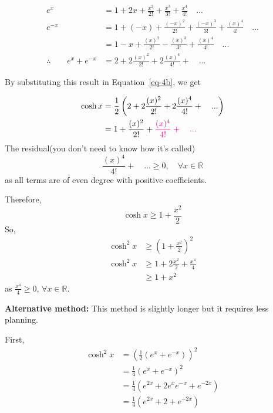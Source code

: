 \documentclass[
  a4paper,
]{report}
\begin{document}
\begin{tcolorbox}
\begin{equation*}
\begin{split}
e^{x}&=1+2x+\frac{x^2}{2!}+\frac{x^3}{3!}+\frac{x^4}{4!} \quad ... \\
e^{-x}&=1+(-x)+\frac{(-x)^2}{2!}+\frac{(-x)^3}{3!}+\frac{(x)^4}{4!} \quad ... \\
&=1-x+\frac{(x)^2}{2!}-\frac{(x)^3}{3!}+\frac{(x)^4}{4!} \quad ... \\
\therefore \qquad e^{x}+e^{-x}&=2+2\frac{(x)^2}{2!}+2\frac{(x)^4}{4!}+ \quad ...
\end{split}
\end{equation*}

By substituting this result in Equation~\ref{eq-4b}, we get

\begin{equation*}
\begin{split}
\cosh x &= \frac{1}{2} \left( 2+2\frac{(x)^2}{2!}+2\frac{(x)^4}{4!}+ \quad ... \right)\\
&= 1+\frac{(x)^2}{2!}+\textcolor{magenta}{\frac{(x)^4}{4!}+ \quad ...}
\end{split}
\end{equation*} The residual(you don't need to know how it's called)
\[\frac{(x)^4}{4!}+ \quad ... \geq 0, \quad \forall x \in \mathbb{R}\]
as all terms are of even degree with positive coefficients.

Therefore, \[\cosh x \geq1+\frac{x^2}{2}\] So, \begin{equation*}
\begin{split}
\cosh^2 x &\geq \left(1+\frac{x^2}{2}\right)^2 \\
\cosh^2 x &\geq 1+2\frac{x^2}{2}+\frac{x^4}{4} \\
 &\geq 1+x^2
\end{split}
\end{equation*} as \(\frac{x^4}{4}\geq0\), \(\forall x \in \mathbb{R}\).

\textbf{Alternative method:} This method is slightly longer but it
requires less planning.

First, \begin{equation*}
\begin{split}
\cosh^2 x &= \left( \frac{1}{2}(e^x+e^{-x}) \right) ^2 \\
&= \frac{1}{4}(e^x+e^{-x})^2 \\
&= \frac{1}{4}(e^{2x}+2e^x e^{-x}+e^{-2x}) \\
&= \frac{1}{4}(e^{2x}+2+e^{-2x})
\end{split}
\end{equation*}


\end{tcolorbox}
\end{document}
